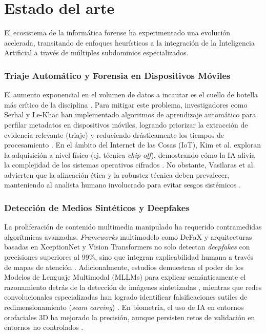 \documentclass[journal]{IEEEtran}
\begin{document}
\section{Estado del arte}
El ecosistema de la informática forense ha experimentado una evolución acelerada, transitando de enfoques heurísticos a la integración de la Inteligencia Artificial a través de múltiples subdominios especializados.

\subsubsection{Triaje Automático y Forensia en Dispositivos Móviles}
El aumento exponencial en el volumen de datos a incautar es el cuello de botella más crítico de la disciplina \cite{QuickDarren2014Ioiv}. Para mitigar este problema, investigadores como Serhal y Le-Khac han implementado algoritmos de aprendizaje automático para perfilar metadatos en dispositivos móviles, logrando priorizar la extracción de evidencia relevante (triaje) y reduciendo drásticamente los tiempos de procesamiento \cite{SerhalCezar2021Mlba}. En el ámbito del Internet de las Cosas (IoT), Kim et al. exploran la adquisición a nivel físico (ej. técnica \textit{chip-off}), demostrando cómo la IA alivia la complejidad de los sistemas operativos cifrados \cite{KimSungbum2022Addf}. No obstante, Vasilaras et al. advierten que la alineación ética y la robustez técnica deben prevalecer, manteniendo al analista humano involucrado para evitar sesgos sistémicos \cite{VASILARAS2024301737}.

\subsubsection{Detección de Medios Sintéticos y Deepfakes}
La proliferación de contenido multimedia manipulado ha requerido contramedidas algorítmicas avanzadas. \textit{Frameworks} multimodelo como DeFaX y arquitecturas basadas en XceptionNet y Vision Transformers no solo detectan \textit{deepfakes} con precisiones superiores al 99\%, sino que integran explicabilidad humana a través de mapas de atención \cite{BharatiNitu2026EddA, Al-ImranMd2025DACF}. Adicionalmente, estudios demuestran el poder de los Modelos de Lenguaje Multimodal (MLLMs) para explicar semánticamente el razonamiento detrás de la detección de imágenes sintetizadas \cite{10.1145/3733102.3733138}, mientras que redes convolucionales especializadas han logrado identificar falsificaciones sutiles de redimensionamiento (\textit{seam carving}) \cite{NevesMiguelJoseDas2025SCFD}. En biometría, el uso de IA en entornos orofaciales 3D ha mejorado la precisión, aunque persisten retos de validación en entornos no controlados \cite{ViegasSofia2026DITf}.
\end{document}
